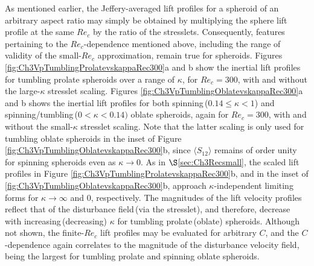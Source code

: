 \documentclass{jfm}
\begin{document}
As mentioned earlier, the Jeffery-averaged lift profiles for a spheroid of an arbitrary aspect ratio may simply be obtained by multiplying the sphere lift profile at the same $Re_c$ by the ratio of the stresslets. Consequently, features pertaining to the $Re_c$-dependence mentioned above, including the range of validity of the small-$Re_c$ approximation, remain true for spheroids. Figures \ref{fig:Ch3VpTumblingProlatevskappaRec300}a and b show the inertial lift profiles for tumbling prolate spheroids over a range of $\kappa$, for $Re_c = 300$, with and without the large-$\kappa$ stresslet scaling. Figures \ref{fig:Ch3VpTumblingOblatevskappaRec300}a and b shows the inertial lift profiles for both spinning\,($0.14\leq\kappa<1$) and spinning/tumbling\,($0<\kappa<0.14)$ oblate spheroids, again for $Re_c = 300$, with and without the small-$\kappa$ stresslet scaling. Note that the latter scaling is only used for tumbling oblate spheroids in the inset of Figure \ref{fig:Ch3VpTumblingOblatevskappaRec300}b, since $\langle S_{12}\rangle$ remains of order unity for spinning spheroids even as $\kappa\to 0$. As in $\S$\ref{sec:Ch3Recsmall}, the scaled lift profiles in Figure \ref{fig:Ch3VpTumblingProlatevskappaRec300}b, and in the inset of \ref{fig:Ch3VpTumblingOblatevskappaRec300}b, approach $\kappa$-independent limiting forms for $\kappa\to\infty$ and $0$, respectively. The magnitudes of the lift velocity profiles reflect that of the disturbance field\,(via the stresslet), and therefore, decrease with increasing\,(decreasing) $\kappa$ for tumbling prolate\,(oblate) spheroids. Although not shown, the finite-$Re_c$ lift profiles may be evaluated for arbitrary $C$, and the $C$-dependence again correlates to the magnitude of the disturbance velocity field, being the largest for tumbling prolate and spinning oblate spheroids.

\end{document}
